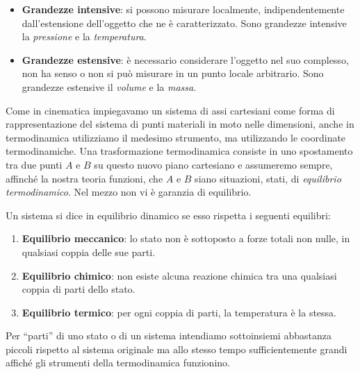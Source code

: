 \begin{itemize}
    \item \textbf{Grandezze intensive}: si possono misurare localmente,
    indipendentemente dall'estensione dell'oggetto che ne è caratterizzato.
    Sono grandezze intensive la \textit{pressione} e la \textit{temperatura}.

    \item \textbf{Grandezze estensive}: è necessario considerare l'oggetto nel
    suo complesso, non ha senso o non si può misurare in un punto locale arbitrario.
    Sono grandezze estensive il \textit{volume} e la \textit{massa}.
\end{itemize}

\noindent Come in cinematica impiegavamo un sistema di assi cartesiani come
forma di rappresentazione del sistema di punti materiali in moto nelle dimensioni,
anche in termodinamica utilizziamo il medesimo strumento, ma utilizzando le
coordinate termodinamiche. Una trasformazione termodinamica consiste in uno
spostamento tra due punti $A$ e $B$ su questo nuovo piano cartesiano e assumeremo
sempre, affinché la nostra teoria funzioni, che $A$ e $B$ siano situazioni, stati, di
\textit{equilibrio termodinamico}. Nel mezzo non vi è garanzia di equilibrio.

Un sistema si dice in equilibrio dinamico se esso rispetta i seguenti equilibri:
\begin{enumerate}
    \item \textbf{Equilibrio meccanico}: lo stato non è sottoposto a forze totali non nulle,
    in qualsiasi coppia delle sue parti.

    \item \textbf{Equilibrio chimico}: non esiste alcuna reazione chimica tra una qualsiasi
    coppia di parti dello stato.

    \item \textbf{Equilibrio termico}: per ogni coppia di parti, la temperatura è la stessa.
\end{enumerate}

\noindent Per ``parti'' di uno stato o di un sistema intendiamo sottoinsiemi
abbastanza piccoli rispetto al sistema originale ma allo stesso tempo sufficientemente
grandi affiché gli strumenti della termodinamica funzionino.